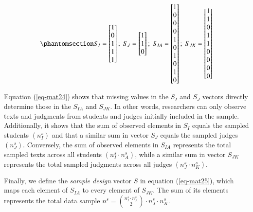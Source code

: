 \documentclass[
  authoryear,
  review,
  1p]{elsarticle}
\begin{document}
\begin{equation}\phantomsection\label{eq-mat24}{
S_{I} = \begin{bmatrix}
1 \\
0 \\
1 \\
1 \\
1
\end{bmatrix} ; \;
S_{J} = \begin{bmatrix}
1 \\
1 \\
0
\end{bmatrix} ; \;
S_{IA} = \begin{bmatrix}
1 \\
0 \\
0 \\
0 \\
1 \\
0 \\
1 \\
0 \\
1 \\
0 
\end{bmatrix} ; \;
S_{JK} = \begin{bmatrix}
1 \\
1 \\
0 \\
1 \\
1 \\
0 \\
0 \\
0 \\
0 
\end{bmatrix}
}\end{equation}

Equation (\ref{eq-mat24}) shows that missing values in the \(S_{I}\) and
\(S_{J}\) vectors directly determine those in the \(S_{IA}\) and
\(S_{JK}\). In other words, researchers can only observe texts and
judgments from students and judges initially included in the sample.
Additionally, it shows that the sum of observed elements in \(S_{I}\)
equals the sampled students \((n^{s}_{I})\) and that a similar sum in
vector \(S_{J}\) equals the sampled judges \((n^{s}_{J})\). Conversely,
the sum of observed elements in \(S_{IA}\) represents the total sampled
texts across all students \((n^{s}_{I} \cdot n^{s}_{A})\), while a
similar sum in vector \(S_{JK}\) represents the total sampled judgments
across all judges \((n^{s}_{J} \cdot n^{s}_{K})\).

Finally, we define the \emph{sample design} vector \(S\) in equation
(\ref{eq-mat25}), which maps each element of \(S_{IA}\) to every element
of \(S_{JK}\). The sum of its elements represents the total data sample
\(n^{s} = \binom{n^{s}_{I} \cdot n^{s}_{A}}{2} \cdot n^{s}_{J} \cdot n^{s}_{K}\).
\end{document}
